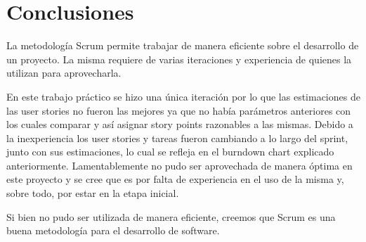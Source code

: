 \section{Conclusiones}

La metodología Scrum permite trabajar de manera eficiente sobre el desarrollo de un proyecto. La misma
requiere de varias iteraciones y experiencia de quienes la utilizan para aprovecharla. 


En este trabajo práctico se hizo una única iteración por lo que las estimaciones de las
user stories no fueron las mejores ya que no había parámetros anteriores con los cuales
comparar y así asignar story points razonables a las mismas. 
Debido a la inexperiencia los user stories y tareas fueron cambiando a lo largo del sprint,
junto con sus estimaciones, lo cual se refleja en el burndown chart explicado anteriormente.
Lamentablemente no pudo ser aprovechada de manera óptima en este proyecto y se cree que es por falta de
experiencia en el uso de la misma y, sobre todo, por estar en la etapa inicial.


Si bien no pudo ser utilizada de manera eficiente, creemos que Scrum es una buena metodología 
para el desarrollo de software.